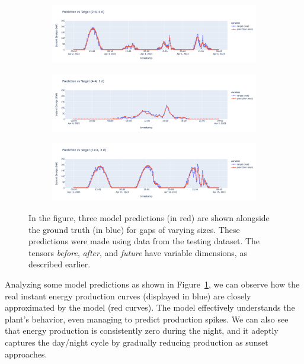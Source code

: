 \begin{figure}[H]
	\centering
	\begin{subfigure}{\textwidth}
		\centering
		\includegraphics[width=\textwidth]{chapters/3_models/imgs/grrun/eval/grruneval24.png}
		\caption{}
	\end{subfigure}
	\begin{subfigure}{\textwidth}
		\centering
		\includegraphics[width=\textwidth]{chapters/3_models/imgs/grrun/eval/grruneval44.png}
		\caption{}
	\end{subfigure}
	\begin{subfigure}{\textwidth}
		\centering
		\includegraphics[width=\textwidth]{chapters/3_models/imgs/grrun/eval/grruneval124.png}
		\caption{}
	\end{subfigure}
	\caption{In the figure, three model predictions (in red) are shown alongside the ground truth (in blue) for gaps of varying sizes. These predictions were made using data from the testing dataset. The tensors \textit{before}, \textit{after}, and \textit{future} have variable dimensions, as described earlier.}
	\label{fig:grrunevalplots}
\end{figure}
\newpage
Analyzing some model predictions as shown in
Figure~\ref{fig:grrunevalplots}, we can observe how the real
instant energy production curves (displayed in blue) are
closely approximated by the model (red curves).
The model effectively understands the plant's behavior,
even managing to predict production spikes.
We can also see that energy production is consistently zero during
the night, and it adeptly captures the
day/night cycle by gradually reducing production as sunset approaches.

